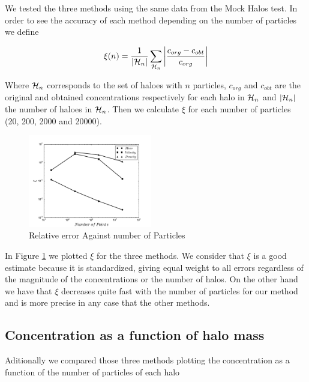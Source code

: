 \documentclass[useAMS,usenatbib]{mn2e}
\begin{document}
We tested the three methods using the same data from the Mock Halos test. In order to see the accuracy of each method depending on the number of particles we define 

\begin{equation}
\xi(n)=\frac{1}{\left|{\cal{H}}_n\right|}\sum_{{\cal{H}}_n}\left|\frac{c_{org}-c_{obt}}{c_{org}}\right|
\end{equation}

Where ${\cal{H}}_n$ corresponds to the set of haloes with $n$ particles, $c_{org}$ and $c_{obt}$ are the original and obtained concentrations respectively for each halo in ${\cal{H}}_n$ and $\left|{\cal{H}}_n\right|$ the number of haloes in ${\cal{H}}_n$. Then we calculate $\xi$ for each number of particles (20, 200, 2000 and 20000).

\begin{figure}
\begin{center}
  \includegraphics[width=0.48\textwidth]{error.pdf}
\end{center}
\caption{Relative error Against number of Particles
    \label{fig:error}}
\end{figure}

In Figure \ref{fig:error} we plotted $\xi$ for the three methods. We consider that $\xi$ is a good estimate because it is standardized, giving equal weight to all errors regardless of the magnitude of the concentrations or the number of halos. On the other hand we have that $\xi$ decreases quite fast with the number of particles for our method and is more precise in any case that the other methods.

\subsection{Concentration as a function of halo mass}
Aditionally we compared those three methods plotting the concentration as a function of the number of particles of each halo 
\end{document}
